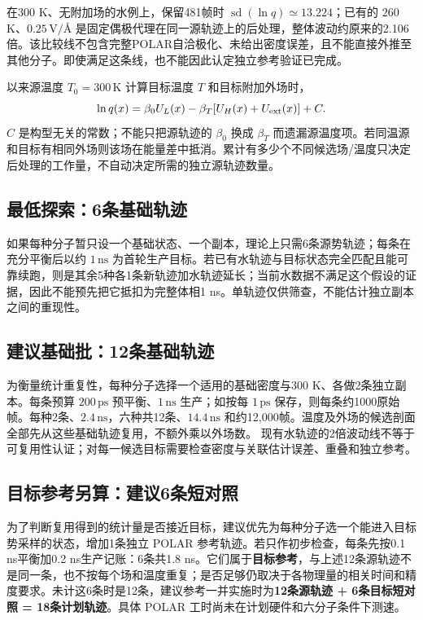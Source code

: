 \documentclass[11pt,a4paper]{article}
\begin{document}
在300 K、无附加场的水例上，保留481帧时 $\operatorname{sd}(\ln q)\simeq13.224$；已有的 $260$ K、$0.25\,\mathrm{V}/\text{\AA}$ 是固定偶极代理在同一源轨迹上的后处理，整体波动约原来的2.106倍。该比较线不包含完整POLAR自洽极化、未给出密度误差，且不能直接外推至其他分子。即使满足这条线，也不能因此认定独立参考验证已完成。

以来源温度 $T_0=300\,\mathrm{K}$ 计算目标温度 $T$ 和目标附加外场时，
\begin{equation}
\ln q(x)=\beta_0 U_L(x)-\beta_T[U_H(x)+U_{\rm ext}(x)]+C.
\end{equation}
$C$ 是构型无关的常数；不能只把源轨迹的 $\beta_0$ 换成 $\beta_T$ 而遗漏源温度项。若同温源和目标有相同外场则该场在能量差中抵消。累计有多少个不同候选场/温度只决定后处理的工作量，不自动决定所需的独立源轨迹数量。

\subsection{最低探索：6条基础轨迹}
如果每种分子暂只设一个基础状态、一个副本，理论上只需6条源势轨迹；每条在充分平衡后以约 $1\,\mathrm{ns}$ 为首轮生产目标。若已有水轨迹与目标状态完全匹配且能可靠续跑，则是其余5种各1条新轨迹加水轨迹延长；当前水数据不满足这个假设的证据，因此不能预先把它抵扣为完整体相1 ns。单轨迹仅供筛查，不能估计独立副本之间的重现性。

\subsection{建议基础批：12条基础轨迹}
为衡量统计重复性，每种分子选择一个适用的基础密度与300 K、各做2条独立副本。每条预算 $200\,\mathrm{ps}$ 预平衡、$1\,\mathrm{ns}$ 生产；如按每 $1\,\mathrm{ps}$ 保存，则每条约1000原始帧。每种2条、$2.4\,\mathrm{ns}$，六种共12条、$14.4\,\mathrm{ns}$ 和约12,000帧。温度及外场的候选剖面全部先从这些基础轨迹复用，不额外乘以外场数。 现有水轨迹的2倍波动线不等于可复用性认证；对每一候选目标需要检查密度与关联估计误差、重叠和独立参考。

\subsection{目标参考另算：建议6条短对照}
为了判断复用得到的统计量是否接近目标，建议优先为每种分子选一个能进入目标势采样的状态，增加1条独立 POLAR 参考轨迹。若只作初步检查，每条先按0.1 ns平衡加0.2 ns生产记账：6条共1.8 ns。它们属于\textbf{目标参考}，与上述12条源轨迹不是同一条，也不按每个场和温度重复；是否足够仍取决于各物理量的相关时间和精度要求。未计这6条时是12条，建议参考一并实施时为\textbf{12条源轨迹 + 6条目标短对照 = 18条计划轨迹}。具体 POLAR 工时尚未在计划硬件和六分子条件下测速。
\end{document}
